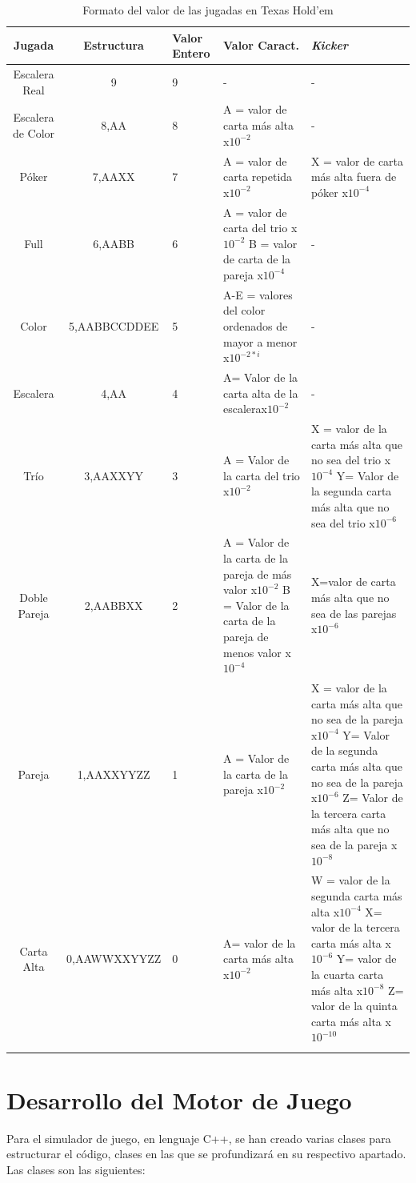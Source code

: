 \begin{longtable}[c]{|c|c|m{3em}|m{8em}|m{8em}|}
\hline
\rowcolor{lightgray} Jugada & Estructura&  Valor Entero & Valor Caract. &  \textit{Kicker}\\ \hline
Escalera Real &9&9&-&-\\
\hline
Escalera de Color&8,AA&8& A = valor de carta más alta x$10^{-2}$&-\\
\hline
Póker&7,AAXX& 7 & A = valor de carta repetida x$10^{-2}$&X = valor de carta más alta fuera de póker x$10^{-4}$ \\
\hline
Full&6,AABB&6&A = valor de carta del trio x$10^{-2}$   B = valor de carta de la pareja  x$10^{-4}$&- \\
\hline
Color &5,AABBCCDDEE&5&A-E = valores del color ordenados de mayor a menor x$10^{-2*i}$&-\\
\hline
Escalera&4,AA&4&A= Valor de la carta alta de la escalerax$10^{-2}$&- \\
\hline
Trío&3,AAXXYY&3 &A = Valor de la carta del trio x$10^{-2}$&X = valor de la carta más alta que no sea del trio x$10^{-4}$ Y= Valor de la segunda carta más alta que no sea del trio x$10^{-6}$ \\
\hline
 Doble Pareja&2,AABBXX& 2 &A = Valor de la carta de la pareja de más valor x$10^{-2}$ B = Valor de la carta de la pareja de menos valor  x$10^{-4}$ &X=valor de carta más alta que no sea de las parejas x$10^{-6}$\\
\hline
 Pareja & 1,AAXXYYZZ & 1& A = Valor de la carta de la pareja x$10^{-2}$&X = valor de la carta más alta que no sea de la pareja x$10^{-4}$ Y= Valor de la segunda carta más alta que no sea de la pareja x$10^{-6}$ Z= Valor de la tercera carta más alta que no sea de la pareja x$10^{-8}$  \\
\hline
 Carta Alta&0,AAWWXXYYZZ & 0& A= valor de la carta más alta x$10^{-2}$&W = valor de la segunda carta más alta x$10^{-4}$ X= valor de la tercera carta más alta x$10^{-6}$ Y= valor de la cuarta carta más alta x$10^{-8}$ Z= valor de la quinta carta más alta x$10^{-10}$ \\
\hline
\caption{Formato del valor de las jugadas en Texas Hold'em}
\label{tab:kicker}
\end{longtable}


\section {Desarrollo del Motor de Juego}
\label{sec:motor}

Para el simulador de juego, en lenguaje C++, se han creado varias clases para estructurar el código, clases en las que se profundizará en su respectivo apartado. Las clases son las siguientes:

